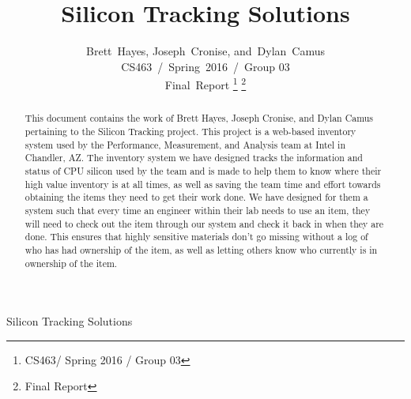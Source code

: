 \documentclass[10pt, onecolumn, twoside, peerreview]{IEEEtran}
\begin{document}
\title{Silicon Tracking Solutions}
%
%

\author{Brett~Hayes,
        Joseph~Cronise,
        and~Dylan~Camus\\%
        CS463~/~Spring~2016~/~Group 03\\%
        Final~Report
\thanks{CS463/ Spring 2016 / Group 03}%
\thanks{Final Report}}

%
{Silicon Tracking Solutions}

\maketitle


\begin{abstract}
This document contains the work of Brett Hayes, Joseph Cronise, and Dylan Camus pertaining to the Silicon Tracking
project. This project is a web-based inventory system used by the Performance, Measurement, and Analysis team at Intel
in Chandler, AZ. The inventory system we have designed tracks the information and status of CPU silicon used by the
team and is made to help them to know where their high value inventory is at all times, as well as saving the team time
and effort towards obtaining the items they need to get their work done. We have designed for them a system such that
every time an engineer within their lab needs to use an item, they will need to check out the item through our system
and check it back in when they are done. This ensures that highly sensitive materials don't go missing without a log of
who has had ownership of the item, as well as letting others know who currently is in ownership of the item.
\end{abstract}

\clearpage
\tableofcontents
\clearpage
\end{document}
